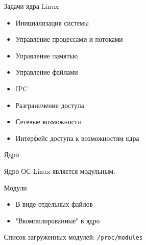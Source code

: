 \begin{frame}{Задачи ядра Linux}
	\begin{itemize}
		\item Инициализация системы
		\item Управление процессами и потоками
		\item Управление памятью
		\item Управление файлами
		\item IPC
		\item Разграничение доступа
		\item Сетевые возможности
		\item Интерфейс доступа к возможностям ядра
	\end{itemize}
\end{frame}


\begin{frame}{Ядро}

	Ядро ОС Linux является модульным. 

	\begin{block}{Модули}
		\begin{itemize}
			\item В виде отдельных файлов
			\item "Вкомпилированные" в ядро
		\end{itemize}
	\end{block}

	\bigskip

	Список загруженных модулей: {\tt /proc/modules}
\end{frame}


